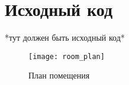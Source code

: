 \chapter{Исходный код}
*тут должен быть исходный код*
\begin{figure}[h]
\texttt{[image: room\_plan]}
\caption{План помещения}
\end{figure}